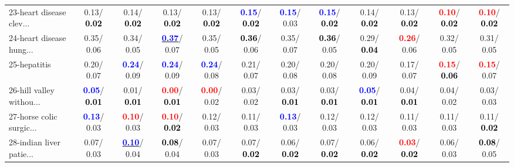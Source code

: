 \begin{table}[h]
\begin{center}
{\begin{tabular}{lc|c|c|c|c|c|c|c|c|c|c}
23-heart disease clev... &   0.13/\textcolor{black}{\textbf{  0.02}} &   0.14/\textcolor{black}{\textbf{  0.02}} &   0.13/\textcolor{black}{\textbf{  0.02}} &   0.13/\textcolor{black}{\textbf{  0.02}} & \textcolor{blue}{\textbf{  0.15}}/\textcolor{black}{\textbf{  0.02}} & \textcolor{blue}{\textbf{  0.15}}/  0.03 & \textcolor{blue}{\textbf{  0.15}}/\textcolor{black}{\textbf{  0.02}} &   0.14/\textcolor{black}{\textbf{  0.02}} &   0.13/\textcolor{black}{\textbf{  0.02}} & \textcolor{red}{\textbf{  0.10}}/\textcolor{black}{\textbf{  0.02}} & \textcolor{red}{\textbf{  0.10}}/\textcolor{black}{\textbf{  0.02}} \\
24-heart disease hung... &   0.35/  0.06 &   0.34/  0.05 & \underline{\textcolor{blue}{\textbf{  0.37}}}/  0.07 &   0.35/  0.05 & \textcolor{black}{\textbf{  0.36}}/  0.06 &   0.35/  0.07 & \textcolor{black}{\textbf{  0.36}}/  0.05 &   0.29/\textcolor{black}{\textbf{  0.04}} & \textcolor{red}{\textbf{  0.26}}/  0.06 &   0.32/  0.05 &   0.31/  0.05 \\
25-hepatitis &   0.20/  0.07 & \textcolor{blue}{\textbf{  0.24}}/  0.09 & \textcolor{blue}{\textbf{  0.24}}/  0.09 & \textcolor{blue}{\textbf{  0.24}}/  0.08 &   0.21/  0.07 &   0.20/  0.08 &   0.20/  0.08 &   0.20/  0.09 &   0.17/  0.07 & \textcolor{red}{\textbf{  0.15}}/\textcolor{black}{\textbf{  0.06}} & \textcolor{red}{\textbf{  0.15}}/  0.07 \\
26-hill valley withou... & \textcolor{blue}{\textbf{  0.05}}/\textcolor{black}{\textbf{  0.01}} &   0.01/\textcolor{black}{\textbf{  0.01}} & \textcolor{red}{\textbf{  0.00}}/\textcolor{black}{\textbf{  0.01}} & \textcolor{red}{\textbf{  0.00}}/  0.02 &   0.03/  0.02 &   0.03/\textcolor{black}{\textbf{  0.01}} &   0.03/\textcolor{black}{\textbf{  0.01}} & \textcolor{blue}{\textbf{  0.05}}/\textcolor{black}{\textbf{  0.01}} &   0.04/\textcolor{black}{\textbf{  0.01}} &   0.04/  0.02 &   0.03/  0.03 \\
27-horse colic surgic... & \textcolor{blue}{\textbf{  0.13}}/  0.03 & \textcolor{red}{\textbf{  0.10}}/  0.03 & \textcolor{red}{\textbf{  0.10}}/\textcolor{black}{\textbf{  0.02}} &   0.12/  0.03 &   0.11/  0.03 & \textcolor{blue}{\textbf{  0.13}}/  0.03 &   0.12/  0.03 &   0.12/  0.03 &   0.11/  0.03 &   0.11/  0.03 &   0.11/\textcolor{black}{\textbf{  0.02}} \\
28-indian liver patie... &   0.07/  0.03 & \underline{\textcolor{blue}{\textbf{  0.10}}}/  0.04 & \textcolor{black}{\textbf{  0.08}}/  0.04 &   0.07/  0.03 &   0.07/\textcolor{black}{\textbf{  0.02}} &   0.06/\textcolor{black}{\textbf{  0.02}} &   0.07/\textcolor{black}{\textbf{  0.02}} &   0.06/\textcolor{black}{\textbf{  0.02}} & \textcolor{red}{\textbf{  0.03}}/\textcolor{black}{\textbf{  0.02}} &   0.06/  0.03 & \textcolor{black}{\textbf{  0.08}}/  0.05 \\ \hline

\end{tabular}}
\end{center}
\end{table}
